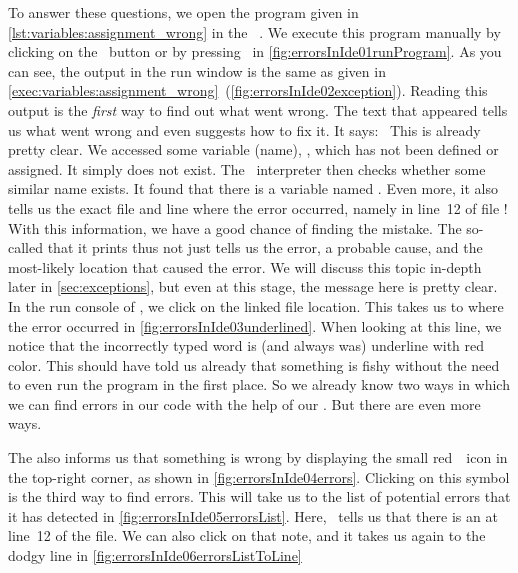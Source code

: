 To answer these questions, we open the program  given in \cref{lst:variables:assignment_wrong} in the \pycharm\ .
We execute this program manually by clicking on the \pycharmRun\ button or by pressing~ in \cref{fig:errorsInIde01runProgram}.
As you can see, the output in the run window is the same as given in \cref{exec:variables:assignment_wrong}~(\cref{fig:errorsInIde02exception}).
Reading this output is the \emph{first} way to find out what went wrong.
The text that appeared tells us what went wrong and even suggests how to fix it.
It says:~\emph{}
This is already pretty clear.
We accessed some variable (name), , which has not been defined or assigned.
It simply does not exist.
The \python\ interpreter then checks whether some similar name exists.
It found that there is a variable named .
Even more, it also tells us the exact file and line where the error occurred, namely in line~12 of file !
With this information, we have a good chance of finding the mistake.
The so-called   that it prints thus not just tells us the error, a probable cause, and the most-likely location that caused the error.
We will discuss this topic in-depth later in \cref{sec:exceptions}, but even at this stage, the message here is pretty clear.%
%
%
%
In the run console of \pycharm, we click on the linked file location.
This takes us to where the error occurred in \cref{fig:errorsInIde03underlined}.
When looking at this line, we notice that the incorrectly typed word is (and always was) underline with red color.
This should have told us already that something is fishy without the need to even run the program in the first place.%
%
%
%
So we already know two ways in which we can find errors in our code with the help of our .
But there are even more ways.

The  also informs us that something is wrong by displaying the small red~\pycharmErrorsSymbol~icon in the top-right corner, as shown in \cref{fig:errorsInIde04errors}.
Clicking on this symbol is the third way to find errors.
This will take us to the list of potential errors that it has detected in \cref{fig:errorsInIde05errorsList}.
Here, \pycharm\ tells us that there is an \emph{} at line~12 of the file.
We can also click on that note, and  it takes us again to the dodgy line in \cref{fig:errorsInIde06errorsListToLine}

